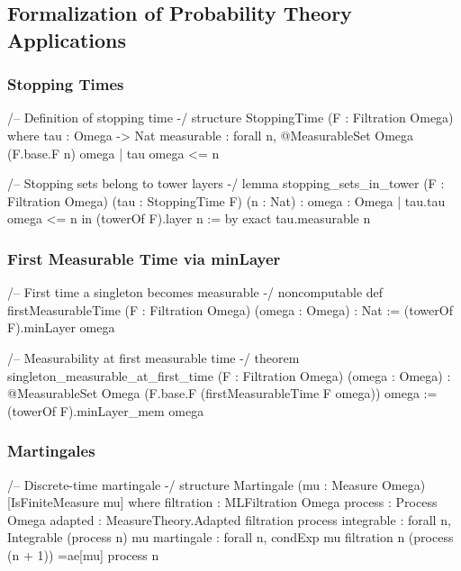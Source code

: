 \documentclass[11pt,a4paper]{article}
\theoremstyle{plain}
\theoremstyle{definition}
\begin{document}
\subsection{Formalization of Probability Theory Applications}

\subsubsection{Stopping Times}

\begin{leancode}
/-- Definition of stopping time -/
structure StoppingTime (F : Filtration Omega) where
  tau : Omega -> Nat
  measurable : forall n, @MeasurableSet Omega (F.base.F n) 
               {omega | tau omega <= n}

/-- Stopping sets belong to tower layers -/
lemma stopping_sets_in_tower (F : Filtration Omega)
    (tau : StoppingTime F) (n : Nat) :
    {omega : Omega | tau.tau omega <= n} in 
    (towerOf F).layer n := by
  exact tau.measurable n
\end{leancode}

\subsubsection{First Measurable Time via minLayer}

\begin{leancode}
/-- First time a singleton becomes measurable -/
noncomputable def firstMeasurableTime 
    (F : Filtration Omega) (omega : Omega) : Nat :=
  (towerOf F).minLayer {omega}

/-- Measurability at first measurable time -/
theorem singleton_measurable_at_first_time 
    (F : Filtration Omega) (omega : Omega) :
    @MeasurableSet Omega 
      (F.base.F (firstMeasurableTime F omega)) {omega} :=
  (towerOf F).minLayer_mem {omega}
\end{leancode}

\subsubsection{Martingales}

\begin{leancode}
/-- Discrete-time martingale -/
structure Martingale (mu : Measure Omega) [IsFiniteMeasure mu] where
  filtration : MLFiltration Omega
  process : Process Omega
  adapted : MeasureTheory.Adapted filtration process
  integrable : forall n, Integrable (process n) mu
  martingale : forall n, 
    condExp mu filtration n (process (n + 1)) =ae[mu] process n
\end{leancode}
\end{document}
